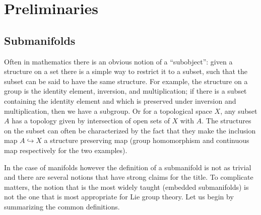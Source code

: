
\chapter{Preliminaries}

\section{Submanifolds}

Often in mathematics there is an obvious notion of a ``subobject'': given a structure on a set there is a simple way to restrict it to a subset, such that the subset can be said to have the same structure.
For example, the structure on a group is the identity element, inversion, and multiplication; if there is a subset containing the identity element and which is preserved under inversion and multiplication, then we have a subgroup.
Or for a topological space $X$, any subset $A$ has a topology given by intersection of open sets of $X$ with $A$.
The structures on the subset can often be characterized by the fact that they make the inclusion map $A \hookrightarrow X$ a structure preserving map (group homomorphism and continuous map respectively for the two examples).

In the case of manifolds however the definition of a submanifold is not as trivial and there are several notions that have strong claims for the title.
To complicate matters, the notion that is the most widely taught (embedded submanifolds) is not the one that is most appropriate for Lie group theory.
Let us begin by summarizing the common definitions.

